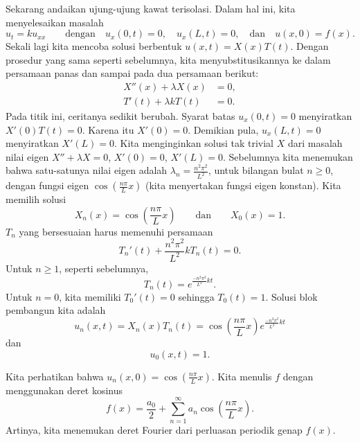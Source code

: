 Sekarang andaikan ujung-ujung kawat terisolasi.
Dalam hal ini, kita menyelesaikan
masalah
\begin{equation*}
u_t = k u_{xx}
\qquad \text{dengan} \quad
u_x(0,t) = 0, \quad u_x(L,t) = 0,
\quad \text{dan} \quad u(x,0) = f(x) .
\end{equation*}
Sekali lagi kita mencoba solusi berbentuk $u(x,t) = X(x)T(t)$.  Dengan prosedur yang
sama seperti sebelumnya, kita menyubstitusikannya ke dalam persamaan panas dan sampai pada
dua persamaan berikut:
\begin{align*}
X''(x) + \lambda X(x) &= 0 , \\
T'(t) + \lambda k T(t) &= 0 .
\end{align*}
Pada titik ini, ceritanya sedikit berubah.
Syarat batas $u_x(0,t) = 0$ menyiratkan $X'(0)T(t) = 0$.
Karena itu $X'(0) = 0$.  Demikian pula, $u_x(L,t) = 0$ menyiratkan $X'(L) = 0$.
Kita menginginkan solusi tak trivial $X$ dari masalah nilai eigen
$X'' + \lambda X = 0$, $X'(0) = 0$, $X'(L) = 0$.  Sebelumnya kita menemukan bahwa
satu-satunya nilai eigen adalah $\lambda_n = \frac{n^2 \pi^2}{L^2}$, untuk bilangan bulat
$n \geq 0$,
dengan fungsi eigen $\cos \left( \frac{n \pi}{L} x\right)$
(kita menyertakan fungsi eigen
konstan).  Kita memilih
solusi
\begin{equation*}
X_n (x) = \cos \left( \frac{n \pi}{L} x \right)
\qquad \text{dan} \qquad
X_0 (x) = 1.
\end{equation*}
$T_n$ yang bersesuaian harus memenuhi persamaan
\begin{equation*}
T_n'(t) + \frac{n^2 \pi^2}{L^2} k T_n(t) = 0 .
\end{equation*}
Untuk $n \geq 1$, seperti sebelumnya,
\begin{equation*}
T_n(t) = e^{\frac{-n^2 \pi^2}{L^2} k t} .
\end{equation*}
Untuk $n = 0$, kita memiliki $T_0'(t) = 0$ sehingga $T_0(t) = 1$.
Solusi blok pembangun kita adalah
\begin{equation*}
u_n(x,t) = X_n(x)T_n(t) =
\cos \left( \frac{n \pi}{L} x \right)
e^{\frac{-n^2 \pi^2}{L^2} k t}
\end{equation*}
dan
\begin{equation*}
u_0(x,t) = 1 .
\end{equation*}

Kita perhatikan bahwa $u_n(x,0) = \cos \left( \frac{n \pi}{L} x \right)$.
Kita menulis $f$ dengan menggunakan deret kosinus
\begin{equation*}
f(x) = \frac{a_0}{2} + \sum_{n=1}^\infty a_n \cos \left( \frac{n \pi}{L} x
\right) .
\end{equation*}
Artinya, kita menemukan deret Fourier dari perluasan periodik genap $f(x)$.

